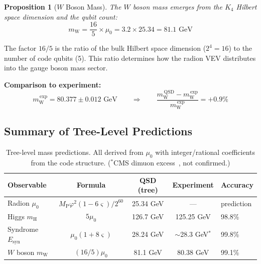 \documentclass[11pt,a4paper]{article}
\newtheorem{proposition}[theorem]{Proposition}
\theoremstyle{definition}
\theoremstyle{remark}
\newcommand{\gr}{\varphi}
\newcommand{\gs}{\varsigma}
\newcommand{\murad}{\mu_0}
\newcommand{\Mpl}{M_{\mathrm{P}}}
\newcommand{\Esyn}{E_{\mathrm{syn}}}
\newcommand{\mH}{m_\mathrm{H}}
\newcommand{\mW}{m_\mathrm{W}}
\begin{document}
\begin{proposition}[$W$ Boson Mass]
\label{prop:W}
The $W$ boson mass emerges from the $K_4$ Hilbert space dimension and the qubit count:
\begin{equation}
\mW = \frac{16}{5} \times \murad = 3.2 \times 25.34 = 81.1 \text{ GeV}
\end{equation}
\end{proposition}

The factor $16/5$ is the ratio of the bulk Hilbert space dimension ($2^4 = 16$) to the number of code qubits (5). This ratio determines how the radion VEV distributes into the gauge boson mass sector.

\textbf{Comparison to experiment:}
\begin{equation}
\mW^{\,\mathrm{exp}} = 80.377 \pm 0.012 \text{ GeV} \qquad \Rightarrow \qquad \frac{\mW^{\,\mathrm{QSD}} - \mW^{\,\mathrm{exp}}}{\mW^{\,\mathrm{exp}}} = +0.9\%
\end{equation}

\subsection{Summary of Tree-Level Predictions}

\begin{table}[H]
\centering
\begin{tabular}{lcccl}
\toprule
\textbf{Observable} & \textbf{Formula} & \textbf{QSD (tree)} & \textbf{Experiment} & \textbf{Accuracy} \\
\midrule
Radion $\murad$ & $\Mpl \gr^2 (1{-}6\gs)/2^{60}$ & 25.34 GeV & --- & prediction \\
Higgs $\mH$ & $5\murad$ & 126.7 GeV & 125.25 GeV & 98.8\% \\
Syndrome $\Esyn$ & $\murad(1{+}8\gs)$ & 28.24 GeV & $\sim$28.3 GeV$^*$ & 99.8\% \\
$W$ boson $\mW$ & $(16/5)\murad$ & 81.1 GeV & 80.38 GeV & 99.1\% \\
\bottomrule
\end{tabular}
\caption{Tree-level mass predictions. All derived from $\murad$ with integer/rational coefficients from the code structure. ($^*$CMS dimuon excess~\cite{CMS2018dimuon}, not confirmed.)}
\label{tab:predictions}
\end{table}
\end{document}
